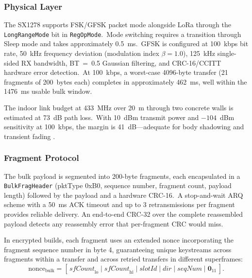 \documentclass[conference]{IEEEtran}
\begin{document}
\subsubsection{Physical Layer}

The SX1278 supports FSK/GFSK packet mode alongside LoRa through the
\texttt{LongRangeMode} bit in \texttt{RegOpMode}.\ Mode switching
requires a transition through Sleep mode and takes approximately
0.5~ms.\ GFSK is configured at 100~kbps bit rate, 50~kHz frequency
deviation (modulation index \(\beta = 1.0\)), 125~kHz single-sided RX
bandwidth, BT~=~0.5 Gaussian filtering, and CRC-16/CCITT hardware
error detection.\ At 100~kbps, a worst-case 4096-byte transfer
(21 fragments of 200~bytes each) completes in approximately 462~ms,
well within the 1476~ms usable bulk window.

The indoor link budget at 433~MHz over 20~m through two concrete walls
is estimated at 73~dB path loss.\ With 10~dBm transmit power and
\(-104\)~dBm sensitivity at 100~kbps, the margin is 41~dB---adequate
for body shadowing and transient fading \cite{augustin_lora_sensors_2016}.

\subsubsection{Fragment Protocol}

The bulk payload is segmented into 200-byte fragments, each
encapsulated in a \texttt{BulkFragHeader} (pktType 0xB0, sequence
number, fragment count, payload length) followed by the payload and a
hardware CRC-16.\ A stop-and-wait ARQ scheme with a 50~ms ACK timeout
and up to 3 retransmissions per fragment provides reliable delivery.
An end-to-end CRC-32 over the complete reassembled payload detects
any reassembly error that per-fragment CRC would miss.

In encrypted builds, each fragment uses an extended nonce
incorporating the fragment sequence number in byte 4, guaranteeing
unique keystreams across fragments within a transfer and across
retried transfers in different superframes:
\begin{equation}
  \text{nonce}_{\text{bulk}} = [\,\mathit{sfCount}_\text{lo} \mid
                                   \mathit{sfCount}_\text{hi} \mid
                                   \mathit{slotId} \mid
                                   \mathit{dir} \mid
                                   \mathit{seqNum} \mid
                                   \mathbf{0}_{11}\,].
  \label{eq:bulk_nonce}
\end{equation}
\end{document}
